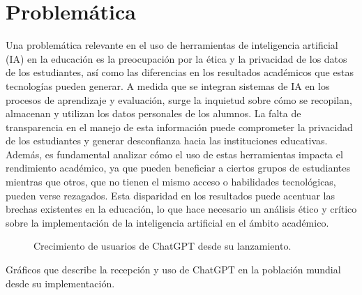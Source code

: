 \documentclass{article}
\newenvironment{problematica}{}{}
\begin{document}
\begin{problematica}

  \section{Problemática}

  Una problemática relevante en el uso de herramientas de inteligencia artificial (IA) en la educación es la preocupación por la ética y la privacidad de los datos de los estudiantes, así como las diferencias en los resultados académicos que estas tecnologías pueden generar. A medida que se integran sistemas de IA en los procesos de aprendizaje y evaluación, surge la inquietud sobre cómo se recopilan, almacenan y utilizan los datos personales de los alumnos. La falta de transparencia en el manejo de esta información puede comprometer la privacidad de los estudiantes y generar desconfianza hacia las instituciones educativas. Además, es fundamental analizar cómo el uso de estas herramientas impacta el rendimiento académico, ya que pueden beneficiar a ciertos grupos de estudiantes mientras que otros, que no tienen el mismo acceso o habilidades tecnológicas, pueden verse rezagados. Esta disparidad en los resultados puede acentuar las brechas existentes en la educación, lo que hace necesario un análisis ético y crítico sobre la implementación de la inteligencia artificial en el ámbito académico.
  
  \begin{figure}[ht]
    \centering
    \caption{Crecimiento de usuarios de ChatGPT desde su lanzamiento.}
    \label{fig:usuarios_chatgpt}
  \end{figure}
    Gráficos que describe la recepción y uso de ChatGPT en la población mundial desde su implementación.
\end{problematica}
\end{document}
